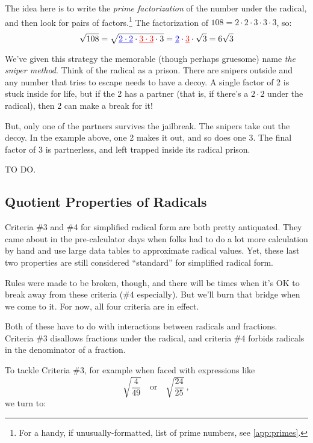 The idea here is to write the \textit{prime factorization} of the number under the radical, and then look for pairs of factors.\footnote{For a handy, if unusually-formatted, list of prime numbers, see \cref{app:primes}.} The factorization of $108 = 2 \cdot 2 \cdot 3 \cdot 3 \cdot 3$, so: \[\sqrt{108} = \sqrt{\underline{\color{blue}2 \cdot 2} \cdot \underline{\color{red}3 \cdot 3} \cdot 3} = \underline{\color{blue}2} \cdot \underline{\color{red}3} \cdot \sqrt{3} = 6\sqrt{3} \]

We've given this strategy the memorable (though perhaps gruesome) name \textit{the sniper method}. Think of the radical as a prison. There are snipers outside and any number that tries to escape needs to have a decoy. A single factor of 2 is stuck inside for life, but if the 2 has a partner (that is, if there's a $2 \cdot 2$ under the radical), then 2 can make a break for it!

But, only one of the partners survives the jailbreak. The snipers take out the decoy. In the example above, one 2 makes it out, and so does one 3. The final factor of 3 is partnerless, and left trapped inside its radical prison.

\begin{boxedex}
	TO DO.
\end{boxedex}

\subsection{Quotient Properties of Radicals}
\label{sec:radquotient}

Criteria \#3 and \#4 for simplified radical form are both pretty antiquated. They came about in the pre-calculator days when folks had to do a lot more calculation by hand and use large data tables to approximate radical values. Yet, these last two properties are still considered ``standard'' for simplified radical form.

Rules were made to be broken, though, and there will be times when it's OK to break away from these criteria (\#4 especially). But we'll burn that bridge when we come to it. For now, all four criteria are in effect.

Both of these have to do with interactions between radicals and fractions. Criteria \#3 disallows fractions under the radical, and criteria \#4 forbids radicals in the denominator of a fraction.

To tackle Criteria \#3, for example when faced with expressions like \[\sqrt{\frac{4}{49}} \quad\text{or}\quad \sqrt{\frac{24}{25}}~,\]we turn to:

